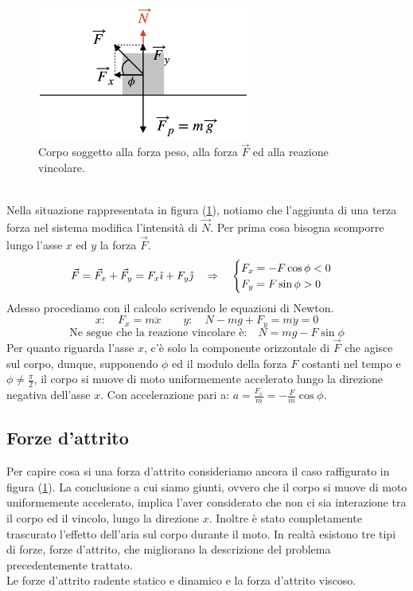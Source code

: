 \begin{figure}[htbp]
    \begin{center}
        \includegraphics[width=7cm]{images/NPF.png}
        \caption{Corpo soggetto alla forza peso, alla forza $\vec F$ ed alla
        reazione vincolare.}
\label{fig:forces:vincolar_reaction_2}
\end{center}
\end{figure}
\\
Nella situazione rappresentata in figura (\ref{fig:forces:vincolar_reaction_2}),
notiamo che l'aggiunta di una terza forza nel sistema modifica l'intensità
di $\vec N$. Per prima cosa bisogna scomporre lungo l'asse $x$ ed $y$ la
forza $\vec F$.
\begin{equation}
    \vec F = \vec F_x + \vec F_y = F_x\hat\imath + F_y\hat\jmath\quad\Rightarrow\quad 
    \begin{cases}
        F_x = -F\cos\phi <0\\
        F_y = F\sin\phi>0
    \end{cases}
\end{equation}
Adesso procediamo con il calcolo scrivendo le equazioni di Newton.
\begin{equation}
    x:\quad F_x = m\ddot x\qquad
    y:\quad N-mg+F_y = m\ddot y = 0
\end{equation}
\begin{equation}
    \mbox{Ne segue che la reazione vincolare è:}\quad \boxed{N = mg -F\sin\phi}
\end{equation}
Per quanto riguarda l'asse $x$, c'è solo la componente orizzontale di
$\vec F$ che agisce sul corpo, dunque, supponendo $\phi$ ed il modulo della
forza $F$ costanti nel tempo e $\phi\ne\frac\pi2$, il corpo si muove di moto
uniformemente accelerato lungo la direzione negativa dell'asse $x$.
Con accelerazione pari a: $a = \frac{F_x}{m} = -\frac Fm\cos\phi$.

\subsection{Forze d'attrito}
Per capire cosa si una forza d'attrito consideriamo ancora il caso raffigurato
in figura (\ref{fig:forces:vincolar_reaction_2}). La conclusione a cui siamo
giunti, ovvero che il corpo si
muove di moto uniformemente accelerato, implica l'aver considerato che non ci
sia interazione tra il corpo ed il vincolo, lungo la direzione $x$.
Inoltre è stato completamente trascurato l'effetto dell'aria sul corpo
durante il moto.
In realtà esistono tre tipi di forze, forze d'attrito, che migliorano la
descrizione del problema precedentemente trattato.\\
Le forze d'attrito radente statico e dinamico e la forza d'attrito viscoso.
